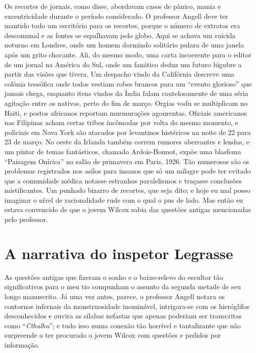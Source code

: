 Os recortes de jornais, como disse, abordavam casos de pânico, mania e
excentricidade durante o período considerado. O professor Angell deve
ter mantido todo um escritório para os recortes, porque o número de
extratos era descomunal e as fontes se espalhavam pelo globo. Aqui se
achava um suicida noturno em Londres, onde um homem dormindo solitário
pulara de uma janela após um grito chocante. Ali, do mesmo modo, uma
carta incoerente para o editor de um jornal na América do Sul, onde um
fanático deduz um futuro lúgubre a partir das visões que tivera. Um
despacho vindo da Califórnia descreve uma colônia teosófica onde todos
vestiam robes brancos para um ``evento glorioso'' que jamais chega,
enquanto itens vindos da Índia falam cautelosamente de uma séria
agitação entre os nativos, perto do fim de março. Orgias vodu se
multiplicam no Haiti, e postos africanos reportam murmurações
agourentas. Oficiais americanos nas Filipinas acham certas tribos
incômodas por volta do mesmo momento, e policiais em Nova York são
atacados por levantinos histéricos na noite de 22 para 23 de março. No
oeste da Irlanda também correm rumores aberrantes e lendas, e um pintor
de temas fantásticos, chamado Ardois-Bonnot, expõe uma blasfema
``Paisagem Onírica'' no salão de primavera em Paris, 1926. Tão numerosos
são os problemas registrados nos asilos para insanos que só um milagre
pode ter evitado que a comunidade médica notasse estranhos paralelismos
e traçasse conclusões mistificantes. Um punhado bizarro de recortes, que
seja dito; e hoje eu mal posso imaginar o nível de racionalidade rude
com o qual o pus de lado. Mas então eu estava convencido de que o jovem
Wilcox sabia das questões antigas mencionadas pelo professor.


{\let\clearpage\relax\chapter{A narrativa do inspetor Legrasse}}

\noindent{}As questões antigas que fizeram o sonho e o baixo-relevo do escultor tão
significativos para o meu tio compunham o assunto da segunda metade de
seu longo manuscrito. Já uma vez antes, parece, o professor Angell
notara os contornos infernais da monstruosidade inominável, intrigara-se
com os hieróglifos desconhecidos e ouvira as sílabas nefastas que apenas
poderiam ser transcritas como ``\emph{Cthulhu}''; e tudo isso numa
conexão tão horrível e tantalizante que não surpreende o ter procurado o
jovem Wilcox com questões e pedidos por informação.

